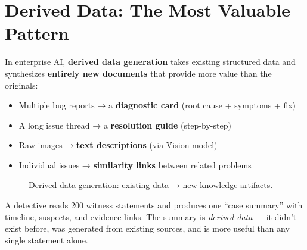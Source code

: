 \documentclass[11pt,a4paper]{report}
\begin{document}
\section{Derived Data: The Most Valuable Pattern}

In enterprise AI, \textbf{derived data generation} takes existing structured data and synthesizes \textbf{entirely new documents} that provide more value than the originals:

\begin{itemize}
    \item Multiple bug reports → a \textbf{diagnostic card} (root cause + symptoms + fix)
    \item A long issue thread → a \textbf{resolution guide} (step-by-step)
    \item Raw images → \textbf{text descriptions} (via Vision model)
    \item Individual issues → \textbf{similarity links} between related problems
\end{itemize}

\begin{figure}[h]
\centering
{}
\caption{Derived data generation: existing data → new knowledge artifacts.}
\label{fig:data-generation}
\end{figure}

\begin{analogybox}
A detective reads 200 witness statements and produces one ``case summary'' with timeline, suspects, and evidence links. The summary is \textit{derived data} --- it didn't exist before, was generated from existing sources, and is more useful than any single statement alone.
\end{analogybox}
\end{document}
